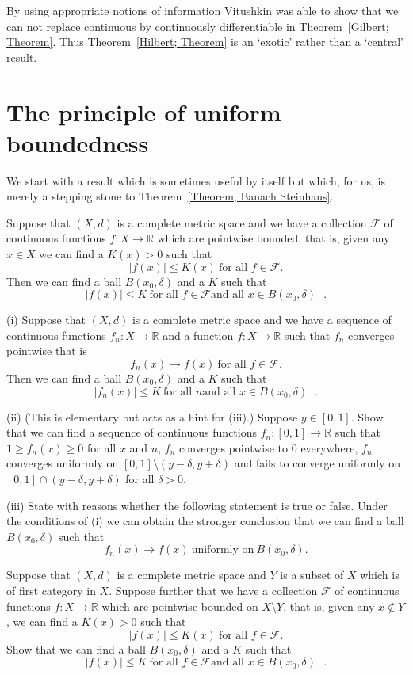 By using appropriate notions of information
Vitushkin was able to show that we can not replace
continuous by continuously differentiable
in Theorem~\ref{Gilbert; Theorem}. Thus
Theorem~\ref{Hilbert; Theorem} is an `exotic'
rather than a `central' result.
\section{The principle of uniform boundedness}
We start with a result which is sometimes useful
by itself but which, for us, is merely a stepping 
stone to Theorem~\ref{Theorem, Banach Steinhaus}.
\begin{lemma}
Suppose that $(X,d)$ is a complete metric space
and we have a collection ${\mathcal F}$ of continuous
functions $f:X\rightarrow{\mathbb R}$ which
are pointwise bounded, that is, given any $x\in X$
we can find a $K(x)>0$ such that
\[|f(x)|\leq K(x)\ \text{for all $f\in{\mathcal F}$}.\]
Then we can find a ball $B(x_{0},\delta)$ and a $K$
such that
\[|f(x)|\leq K\ \text{for all $f\in{\mathcal F}$
and all $x\in B(x_{0},\delta)$ }.\]
\end{lemma}
\begin{exercise} (i) Suppose that $(X,d)$ is a complete metric space
and we have a sequence of continuous
functions $f_{n}:X\rightarrow{\mathbb R}$ and
a function $f:X\rightarrow{\mathbb R}$
such that $f_{n}$ converges pointwise
that is
\[f_{n}(x)\rightarrow f(x)\ \text{for all $f\in{\mathcal F}$}.\]
Then we can find a ball $B(x_{0},\delta)$ and a $K$
such that
\[|f_{n}(x)|\leq K\ \text{for all $n$
and all $x\in B(x_{0},\delta)$ }.\]

(ii) (This is elementary but acts as a hint for (iii).)
Suppose $y\in [0,1]$. Show that we can find
a sequence of continuous functions $f_{n}:[0,1]\rightarrow{\mathbb R}$
such that $1\geq f_{n}(x)\geq 0$ for all $x$ and $n$,
$f_{n}$ converges pointwise to $0$ everywhere,
$f_{n}$ converges uniformly on $[0,1]\setminus (y-\delta,y+\delta)$
and fails to converge uniformly on 
$[0,1]\cap (y-\delta,y+\delta)$  for all $\delta>0$.

(iii) State with reasons whether the following statement
is true or false. Under the conditions of (i) we can obtain the 
stronger conclusion that
we can find a ball $B(x_{0},\delta)$ such that
\[f_{n}(x)\rightarrow f(x)\ \text{uniformly on}
\ B(x_{0},\delta).\]
\end{exercise}
\begin{exercise}
Suppose that $(X,d)$ is a complete metric space
and $Y$ is a subset of $X$ which is of first category
in $X$.
Suppose further that we have a collection ${\mathcal F}$ of continuous
functions $f:X\rightarrow{\mathbb R}$ which
are pointwise bounded on $X\setminus Y$,
that is, given any $x\notin Y$,
we can find a $K(x)>0$ such that
\[|f(x)|\leq K(x)\ \text{for all $f\in{\mathcal F}$}.\]
Show that
we can find a ball $B(x_{0},\delta)$ and a $K$
such that
\[|f(x)|\leq K\ \text{for all $f\in{\mathcal F}$
and all $x\in B(x_{0},\delta)$ }.\]
\end{exercise}

